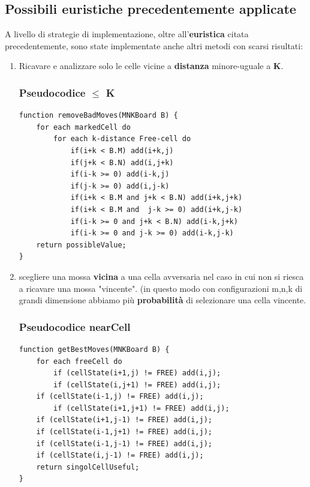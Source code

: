 \documentclass{article}
\begin{document}
        
    

     \subsection{Possibili euristiche precedentemente applicate}
    A livello di strategie di implementazione, oltre all'\textbf{euristica} citata precedentemente, sono state implementate anche altri metodi con scarsi risultati:
    
    \begin{enumerate}
        \item Ricavare e analizzare solo le celle vicine a \textbf{distanza} minore-uguale a \textbf{K}. 
    \subsubsection{Pseudocodice $\leq$ K}
    \lstset{language=java}
    \begin{lstlisting}[frame=single]  
function removeBadMoves(MNKBoard B) {
    for each markedCell do
        for each k-distance Free-cell do 
            if(i+k < B.M) add(i+k,j)
    	    if(j+k < B.N) add(i,j+k)
    	    if(i-k >= 0) add(i-k,j)
    	    if(j-k >= 0) add(i,j-k)
    	    if(i+k < B.M and j+k < B.N) add(i+k,j+k)
    	    if(i+k < B.M and  j-k >= 0) add(i+k,j-k)
    	    if(i-k >= 0 and j+k < B.N) add(i-k,j+k)
    	    if(i-k >= 0 and j-k >= 0) add(i-k,j-k)
    return possibleValue;
}
    \end{lstlisting}
        
        \item scegliere una mossa \textbf{vicina} a una cella avversaria nel caso in cui non si riesca a ricavare una mossa "vincente". (in questo modo con configurazioni m,n,k di grandi dimensione abbiamo più \textbf{probabilità} di selezionare una cella vincente. 
        
    \subsubsection{Pseudocodice nearCell}
    \lstset{language=java}
    \begin{lstlisting}[frame=single]  
function getBestMoves(MNKBoard B) {
    for each freeCell do
        if (cellState(i+1,j) != FREE) add(i,j);
        if (cellState(i,j+1) != FREE) add(i,j);
	if (cellState(i-1,j) != FREE) add(i,j);
        if (cellState(i+1,j+1) != FREE) add(i,j);
	if (cellState(i+1,j-1) != FREE) add(i,j);
	if (cellState(i-1,j+1) != FREE) add(i,j);
	if (cellState(i-1,j-1) != FREE) add(i,j);
	if (cellState(i,j-1) != FREE) add(i,j);
    return singolCellUseful;
}
    \end{lstlisting}
        
 
    \end{enumerate}
    
\end{document}

